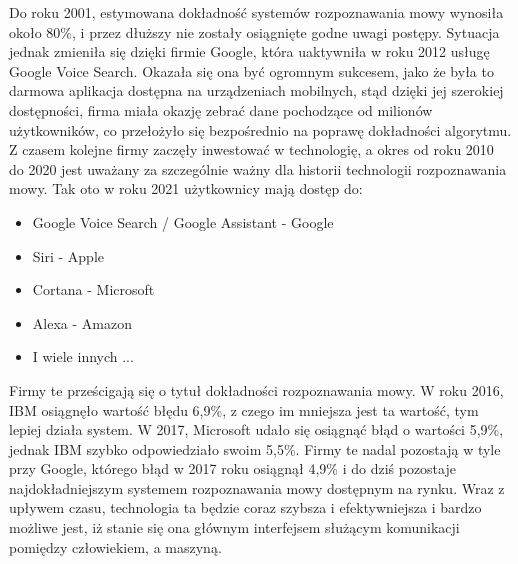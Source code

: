 \documentclass[12pt, a4paper]{article}
\begin{document}
\begin{sloppypar}
{{    Do roku 2001, estymowana dokładność systemów rozpoznawania mowy wynosiła około 80\%,
    i przez dłuższy nie zostały osiągnięte godne uwagi postępy. Sytuacja jednak
    zmieniła się dzięki firmie Google, która uaktywniła w roku 2012 usługę Google 
    Voice Search. Okazała się ona być ogromnym sukcesem, jako że była to darmowa 
    aplikacja dostępna na urządzeniach mobilnych, stąd dzięki jej szerokiej dostępności,
    firma miała okazję zebrać dane pochodzące od milionów użytkowników, co przełożyło
    się bezpośrednio na poprawę dokładności algorytmu. Z czasem kolejne firmy
    zaczęły inwestować w technologię, a okres od roku 2010 do 2020 jest uważany za
    szczególnie ważny dla historii technologii rozpoznawania mowy. Tak oto w roku 2021
    użytkownicy mają dostęp do:
    \begin{itemize}
      \item Google Voice Search / Google Assistant - Google 
      \item Siri - Apple
      \item Cortana - Microsoft
      \item Alexa - Amazon
      \item I wiele innych ...
    \end{itemize}
    Firmy te prześcigają się o tytuł dokładności rozpoznawania mowy. W roku 2016, IBM
    osiągnęło wartość błędu 6,9\%, z czego im mniejsza jest ta wartość, tym lepiej działa
    system. W 2017, Microsoft udało się osiągnąć błąd o
    wartości 5,9\%, jednak IBM szybko odpowiedziało swoim 5,5\%. Firmy te
    nadal pozostają w tyle przy Google, którego błąd w 2017 roku osiągnął 4,9\% i do
    dziś pozostaje najdokładniejszym systemem rozpoznawania mowy dostępnym na rynku.
    Wraz z upływem czasu, technologia ta będzie coraz szybsza i
    efektywniejsza i bardzo możliwe jest, iż stanie się ona głównym interfejsem służącym
    komunikacji pomiędzy człowiekiem, a maszyną. 

}}
\end{sloppypar}
\end{document}
